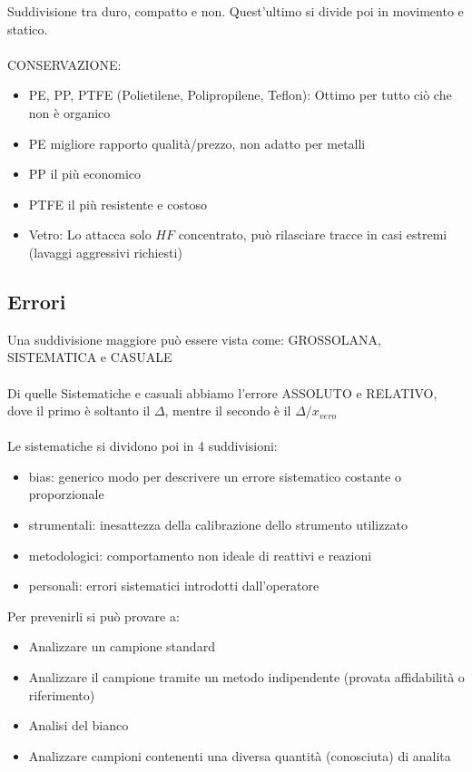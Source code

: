\documentclass{article}
\begin{document}
%
Suddivisione tra duro, compatto e non. Quest'ultimo si divide poi in movimento e statico.
\\\\
CONSERVAZIONE:
\begin{itemize}
	\item PE, PP, PTFE (Polietilene, Polipropilene, Teflon): Ottimo per tutto ciò che non è organico
	\item PE migliore rapporto qualità/prezzo, non adatto per metalli
	\item PP il più economico
	\item PTFE il più resistente e costoso
	\item Vetro: Lo attacca solo $HF$ concentrato, può rilasciare tracce in casi estremi (lavaggi aggressivi richiesti)
\end{itemize}

\newpage

\subsection{Errori}
Una suddivisione maggiore può essere vista come: GROSSOLANA, SISTEMATICA e CASUALE
\\\\
Di quelle Sistematiche e casuali abbiamo l'errore ASSOLUTO e RELATIVO, dove il primo è soltanto il $\Delta$, mentre il secondo è il $\Delta / x_{vero}$
\\\\
Le sistematiche si dividono poi in 4 suddivisioni:
\begin{itemize}
	\item bias: generico modo per descrivere un errore sistematico costante o proporzionale
	\item strumentali: inesattezza della calibrazione dello strumento utilizzato
	\item metodologici: comportamento non ideale di reattivi e reazioni
	\item personali: errori sistematici introdotti dall'operatore
\end{itemize}
%
Per prevenirli si può provare a:
\begin{itemize}
	\item Analizzare un campione standard
	\item Analizzare il campione tramite un metodo indipendente (provata affidabilità o riferimento)
	\item Analisi del bianco
	\item Analizzare campioni contenenti una diversa quantità (conosciuta) di analita
\end{itemize}
\end{document}
